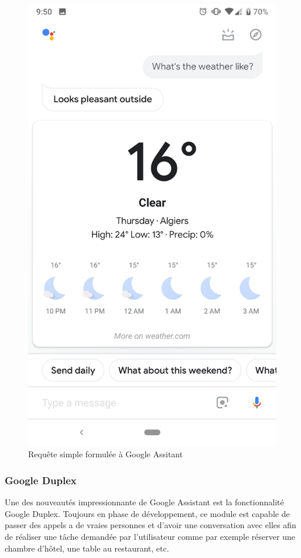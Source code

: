 \begin{figure}[h]
\begin{minipage}[b]{.45\textwidth}
	\end{minipage}
	\hspace{0.5cm}
	\begin{minipage}[b]{.45\textwidth}
		\centering
		\includegraphics[width=.85\linewidth]{images/google_assitant/weather.png} 
		\caption{Requête simple formulée à Google Assitant}
		\label{fig:ga_query}
	\end{minipage}
\end{figure}


\subsubsection*{Google Duplex}\label{duplex}

\par Une des nouveautés impressionnante de Google Assistant est la fonctionnalité Google Duplex. Toujours en phase de développement, ce module est capable de passer des appels a de vraies personnes et d'avoir une conversation avec elles afin de réaliser une tâche demandée par l'utilisateur comme par exemple réserver une chambre d'hôtel, une table au restaurant, etc. 


